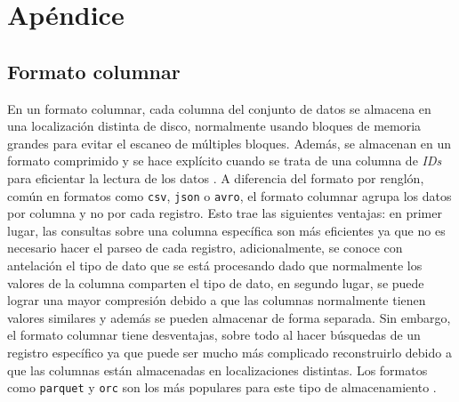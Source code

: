 \chapter{Apéndice}

\section{Formato columnar\label{formatocolumnar}}

\noindent En un formato columnar, cada columna del conjunto de datos se almacena en una localización distinta de disco, normalmente usando bloques de memoria grandes para evitar el escaneo de múltiples bloques. Además, se almacenan en un formato comprimido y se hace explícito cuando se trata de una columna de \textit{IDs} para eficientar la lectura de los datos \cite{column-oriented}. A diferencia del formato por renglón, común en formatos como \texttt{csv}, \texttt{json} o \texttt{avro}, el formato columnar agrupa los datos por columna y no por cada registro. Esto trae las siguientes ventajas: en primer lugar, las consultas sobre una columna específica son más eficientes ya que no es necesario hacer el parseo de cada registro, adicionalmente, se conoce con antelación el tipo de dato que se está procesando dado que normalmente los valores de la columna comparten el tipo de dato, en segundo lugar, se puede lograr una mayor compresión debido a que las columnas normalmente tienen valores similares y además se pueden almacenar de forma separada. Sin embargo, el formato columnar tiene desventajas, sobre todo al hacer búsquedas de un registro específico ya que puede ser mucho más complicado reconstruirlo debido a que las columnas están almacenadas en localizaciones distintas. Los formatos como \texttt{parquet} y \texttt{orc} son los más populares para este tipo de almacenamiento \cite{columnar-storage-blog}.